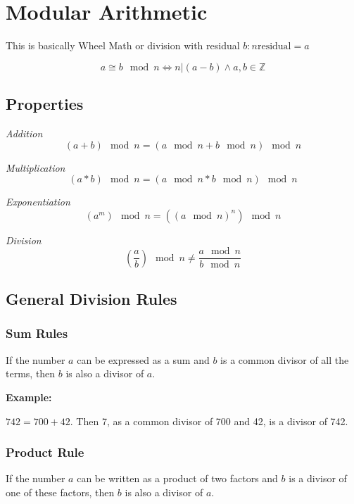 \newpage
\section{Modular Arithmetic}

This is basically Wheel Math or division with residual \(b : n \text{residual} = a\)

\[a \cong b \mod n \iff n | (a - b) \land  a,b \in \mathbb{Z}\]

\subsection{Properties}

\emph{Addition}
\[(a + b) \mod n = (a \mod n + b \mod n) \mod n\]

\emph{Multiplication}
\[(a * b) \mod n = (a \mod n * b \mod n) \mod n\]

\emph{Exponentiation}
\[(a^m) \mod n = ({(a \mod n)}^n) \mod n\]

\emph{Division}
\[(\frac{a}{b}) \mod n \ne  \frac{a \mod n}{b \mod n}\]

\subsection{General Division Rules}

\subsubsection{Sum Rules}

If the number \( a \) can be expressed as a sum and \( b \) is a common divisor of all the terms, then \( b \) is also a divisor of \( a \). \\
\vspace{\baselineskip}

\textbf{Example:} 
\vspace{\baselineskip}

\( 742 = 700 + 42 \). Then 7, as a common divisor of 700 and 42, is a divisor of 742.

\subsubsection{Product Rule}

If the number \( a \) can be written as a product of two factors and \( b \) is a divisor of one of these factors, then \( b \) is also a divisor of \( a \). \\
\vspace{\baselineskip}

